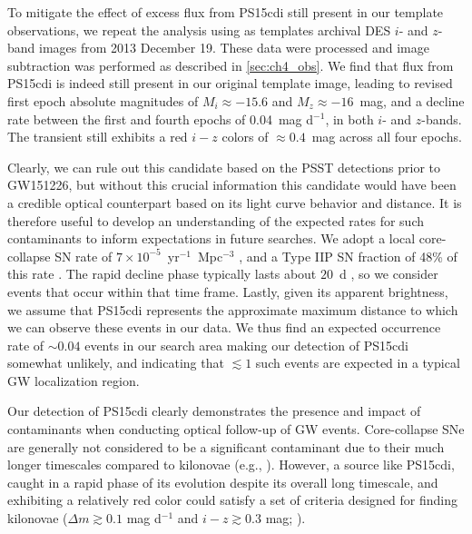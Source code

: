 To mitigate the effect of excess flux from PS15cdi still present in our template observations, we repeat the analysis 
using as templates archival DES $i$- and $z$-band images from 2013 December 19. These data were processed 
and image subtraction was performed as described in \cref{sec:ch4_obs}. We find that flux from PS15cdi is indeed still present 
in our original template image, leading to revised first epoch absolute magnitudes of $M_i \approx -15.6$ and 
$M_z \approx -16$~mag, and a decline rate between the first and fourth epochs of 0.04~mag d$^{-1}$, in both 
$i$- and $z$-bands. The transient still exhibits a red $i-z$ colors of $\approx 0.4$~mag across all four epochs. 

\clearpage
Clearly, we can rule out this candidate based on the PSST detections prior to 
GW151226, but without this crucial information this candidate
would have been a credible optical counterpart based on its light curve behavior and distance. 
It is therefore useful to develop an understanding of the expected rates for such contaminants
to inform expectations in future searches. We adopt a local core-collapse SN rate of  
$7\times10^{-5}$~yr$^{-1}$~Mpc$^{-3}$ \citep{Li+11,Cappellaro+15}, 
and a Type IIP SN fraction of 48\% of this rate \citep{Smith+11}. The rapid
decline phase typically lasts about $20$~d \citep{KasenWoosley09,Sanders+15,Dhungana+16}, 
so we consider events that occur within that time frame. Lastly, given its apparent brightness, 
we assume that PS15cdi represents the approximate maximum distance to which we can observe
these events in our data. We thus find an expected occurrence rate of $\sim 0.04$ events in our search area
making our detection of PS15cdi somewhat unlikely, and indicating that $\lesssim 1$ such 
events are expected in a typical GW localization region.

Our detection of PS15cdi clearly demonstrates the presence and impact
of contaminants when conducting optical follow-up of GW events.
Core-collapse SNe are generally not considered to be a
significant contaminant due to their much longer timescales compared
to kilonovae (e.g., \citealt{CowpBerger15}). However, a
source like PS15cdi, caught in a rapid phase of its evolution 
despite its overall long timescale, and
exhibiting a relatively red color could
satisfy a set of criteria designed for finding kilonovae ($\Delta m\gtrsim
0.1$ mag d$^{-1}$ and $i-z\gtrsim 0.3$ mag; \citealt{CowpBerger15}). 

